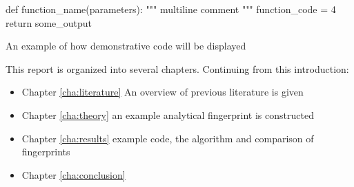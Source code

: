 \begin{listing}[hbtp!]
\begin{ExampleCode}
def function_name(parameters):
    """
    multiline comment
    """
    function_code = 4
    return some_output
\end{ExampleCode}
\caption{An example of how demonstrative code will be displayed}
\label{lst:exampleexamplecode}
\end{listing}{}

This report is organized into several chapters. Continuing from this introduction:

\begin{itemize}
    \item Chapter \ref{cha:literature} An overview of previous literature is given
    \item Chapter \ref{cha:theory} an example analytical fingerprint is constructed
    \item Chapter \ref{cha:results} example code, the algorithm and comparison of fingerprints
    \item Chapter \ref{cha:conclusion}
\end{itemize}


